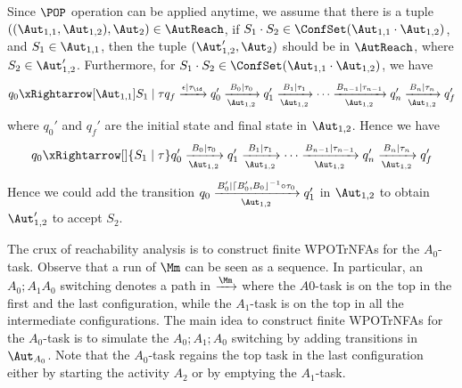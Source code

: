 Since $\POP$ operation can be applied anytime, we assume that there is a tuple $((\Aut_{1,1},\Aut_{1,2}),\Aut_2)\in\AutReach$, if $S_1\cdot S_2\in\ConfSet(\Aut_{1,1}\cdot\Aut_{1,2})$, and $S_1\in\Aut_{1,1}$, then the tuple $(\Aut_{1,2}',\Aut_2)$ should be in $\AutReach$, where $S_2\in\Aut_{1,2}'$.
Furthermore, for $S_1\cdot S_2\in\ConfSet(\Aut_{1,1}\cdot\Aut_{1,2})$, we have 
$$q_0\xRightarrow[\Aut_{1,1}]{S_1\mid\tau}q_f\xrightarrow[]{\epsilon\mid\tau_{\id}}q_0'\xrightarrow[\Aut_{1,2}]{B_0\mid\tau_0}q_1'\xrightarrow[\Aut_{1,2}]{B_1\mid\tau_1}\cdots\xrightarrow[\Aut_{1,2}]{B_{n-1}\mid\tau_{n-1}}q_n'\xrightarrow[\Aut_{1,2}]{B_n\mid\tau_n}q_f'$$
where $q_0'$ and $q_f'$ are the initial state and final state in $\Aut_{1,2}$. Hence we have
$$q_0\xRightarrow[]{S_1\mid\tau}q_0'\xrightarrow[\Aut_{1,2}]{B_0\mid\tau_0}q_1'\xrightarrow[\Aut_{1,2}]{B_1\mid\tau_1}\cdots\xrightarrow[\Aut_{1,2}]{B_{n-1}\mid\tau_{n-1}}q_n'\xrightarrow[\Aut_{1,2}]{B_n\mid\tau_n}q_f'$$
Hence we could add the transition $q_0\xrightarrow[\Aut_{1,2}]{B_0'\mid\lceil B_0',B_0\rfloor^{-1}\circ\tau_0} q_1'$ in $\Aut_{1,2}$ to obtain $\Aut_{1,2}'$ to accept $S_2$.

The crux of reachability analysis is to construct finite WPOTrNFAs for the $A_0$-task. Observe that a run of $\Mm$ can be seen as a sequence. In particular, an $A_0;A_1A_0$ switching denotes a path in $\xrightarrow[]{\Mm}$ where the $A0$-task is on the top in the first and the last configuration, while the $A_1$-task is on the top in all the intermediate configurations. The main idea to construct finite WPOTrNFAs for the $A_0$-task is to simulate the $A_0;A_1;A_0$ switching by adding transitions in $\Aut_{A_0}$. Note that the $A_0$-task regains the top task in the last configuration either by starting the activity $A_2$ or by emptying the $A_1$-task. 

